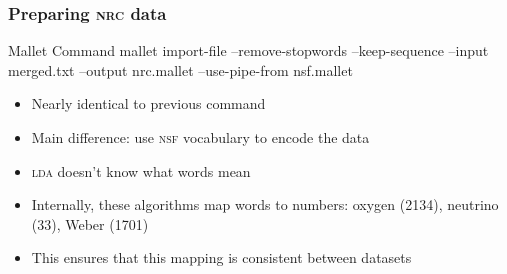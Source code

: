 \begin{frame}
  \frametitle{Preparing \textsc{nrc} data}

  \begin{block}{Mallet Command}
    mallet import-file --remove-stopwords --keep-sequence --input merged.txt --output nrc.mallet \alert<2>{--use-pipe-from nsf.mallet}
  \end{block}

  \begin{itemize}
    \item Nearly identical to previous command
    \pause
    \item Main difference: use \textsc{nsf} vocabulary to encode the data
    \item \textsc{lda} doesn't know what words mean
    \item Internally, these algorithms map words to numbers: oxygen (2134), neutrino (33), Weber (1701)
    \item This ensures that this mapping is consistent between datasets
   \end{itemize}

\end{frame}


